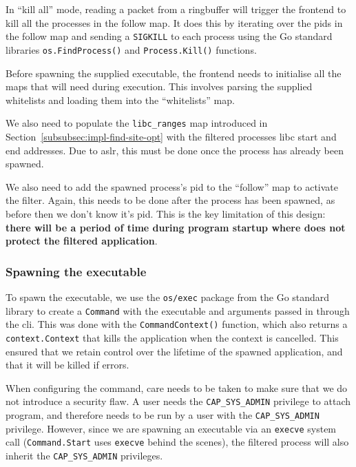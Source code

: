 In ``kill all'' mode, reading a packet from a ringbuffer will trigger
the frontend to kill all the processes in the follow map. It does this by
iterating over the \acp{pid} in the follow map and sending a \texttt{SIGKILL} to
each process using the Go standard libraries \texttt{os.FindProcess()} and
\texttt{Process.Kill()} functions.

Before spawning the supplied executable, the frontend needs to initialise all
the maps that \af will need during execution. This involves parsing the
supplied whitelists and loading them into the ``whitelists'' map. 

We also need to populate the \texttt{libc\_ranges} map introduced in
Section~\ref{subsubsec:impl-find-site-opt} with the filtered processes \ac{libc}
start and end addresses. Due to \ac{aslr}, this must be done once the process
has already been spawned. 

We also need to add the spawned process's \ac{pid} to the ``follow'' map to
activate the filter. Again, this needs to be done after the process has been
spawned, as before then we don't know it's \ac{pid}. This is the key limitation of 
this design: \textbf{there will be a period of time during program startup where \af 
does not protect the filtered application}.

\subsubsection{Spawning the executable} \label{subsubsec:spawning-exec}

To spawn the executable, we use the \texttt{os/exec} package from the Go
standard library to create a \texttt{Command} with the executable and arguments
passed in through the \ac{cli}. This was done with the \texttt{CommandContext()}
function, which also returns a \texttt{context.Context} that kills the
application when the context is cancelled. This ensured that we retain control
over the lifetime of the spawned application, and that it will be killed if \af
errors.

When configuring the command, care needs to be taken to make sure that we do not 
introduce a security flaw. A user needs the \texttt{CAP\_SYS\_ADMIN} privilege
to attach  program, and therefore \af needs to be run by a user with
the \texttt{CAP\_SYS\_ADMIN} privilege. However, since we are spawning an
executable via an \texttt{execve} system call (\texttt{Command.Start} uses
\texttt{execve} behind the scenes), the filtered process will also inherit the
\texttt{CAP\_SYS\_ADMIN} privileges.

